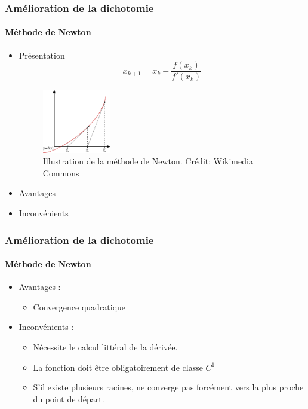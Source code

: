 \documentclass[french]{beamer}
\begin{document}
\begin{frame}
\frametitle{Amélioration de la dichotomie}
\framesubtitle{Méthode de Newton}
\begin{itemize}
\item Présentation
\\
\begin{equation}
x_{k+1} = x_k - \frac{f(x_k)}{f'(x_k)}
\end{equation}
\begin{figure}[htb!]
\includegraphics[width=3cm]{figures/Newton_method.png}
\caption{Illustration de la méthode de Newton. Crédit: Wikimedia Commons}
\end{figure}
\item Avantages
\item Inconvénients
\end{itemize}
\end{frame}




\begin{frame}
\frametitle{Amélioration de la dichotomie}
\framesubtitle{Méthode de Newton}
\begin{itemize}
\item Avantages :
\begin{itemize}
\item Convergence quadratique
\end{itemize}
\item Inconvénients :
\begin{itemize}
\item Nécessite le calcul littéral de la dérivée.
\item La fonction doit être obligatoirement de classe $C^1$
\item S'il existe plusieurs racines, ne converge pas forcément vers la plus proche du point de départ.
\end{itemize}
\end{itemize}
\end{frame}
\end{document}
